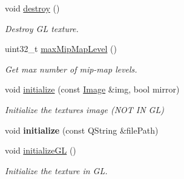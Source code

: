 \begin{Indent}
\begin{DoxyCompactItemize}
\mbox{\label{classrev_1_1_texture_abe949a44a20c5c2bfb0c9c6b8c4a9968}} 
void \mbox{\hyperlink{classrev_1_1_texture_abe949a44a20c5c2bfb0c9c6b8c4a9968}{destroy}} ()
\begin{DoxyCompactList}\small\item\em Destroy GL texture. \end{DoxyCompactList}\item 
\mbox{\label{classrev_1_1_texture_ae8b2abcf83183df650df30eefe32a7fc}} 
uint32\+\_\+t \mbox{\hyperlink{classrev_1_1_texture_ae8b2abcf83183df650df30eefe32a7fc}{max\+Mip\+Map\+Level}} ()
\begin{DoxyCompactList}\small\item\em Get max number of mip-\/map levels. \end{DoxyCompactList}\item 
\mbox{\label{classrev_1_1_texture_ac865074da84df91e6f08e0ed066a6f86}} 
void \mbox{\hyperlink{classrev_1_1_texture_ac865074da84df91e6f08e0ed066a6f86}{initialize}} (const \mbox{\hyperlink{classrev_1_1_image}{Image}} \&img, bool mirror)
\begin{DoxyCompactList}\small\item\em Initialize the texture\textquotesingle{}s image (N\+OT IN GL) \end{DoxyCompactList}\item 
\mbox{\label{classrev_1_1_texture_a2e91480d3fb0f7658e4d87bdd28b2286}} 
void {\bfseries initialize} (const Q\+String \&file\+Path)
\item 
\mbox{\label{classrev_1_1_texture_a5867a6af966a23b82575222239b57fb4}} 
void \mbox{\hyperlink{classrev_1_1_texture_a5867a6af966a23b82575222239b57fb4}{initialize\+GL}} ()
\begin{DoxyCompactList}\small\item\em Initialize the texture in GL. \end{DoxyCompactList}\end{DoxyCompactItemize}
\end{Indent}

